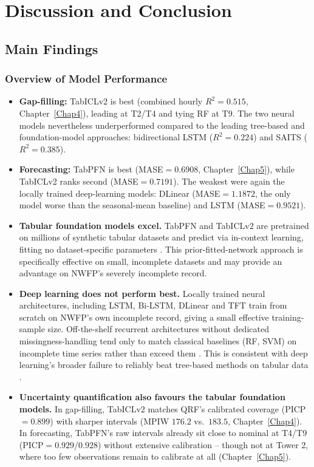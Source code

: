 \chapter{Discussion and Conclusion} \label{Chap7}

\section{Main Findings}

\subsection{Overview of Model Performance} \label{sec:model_performance_overview}

\begin{itemize}
    \item \textbf{Gap-filling:} TabICLv2 is best (combined hourly $R^2=0.515$,
    Chapter~\ref{Chap4}), leading at T2/T4 and tying RF at T9. The two neural models nevertheless 
    underperformed compared to the leading tree-based and foundation-model approaches:
    bidirectional LSTM ($R^2=0.224$) and SAITS ($R^2=0.385$).
    \item \textbf{Forecasting:} TabPFN is best (MASE$=0.6908$, Chapter~\ref{Chap5}), while TabICLv2
    ranks second (MASE$=0.7191$). The weakest were again the locally trained deep-learning models:
    DLinear (MASE$=1.1872$, the only model worse than the seasonal-mean baseline) and LSTM (MASE$=0.9521$).
    \item \textbf{Tabular foundation models excel.} TabPFN and TabICLv2 are pretrained on
    millions of synthetic tabular datasets and predict via in-context learning, fitting no
    dataset-specific parameters \cite{hollmann2023tabpfn,hollmann2025tabpfn,qu2025tabicl,qu2026tabiclv2}.
    This prior-fitted-network approach is specifically effective on small, incomplete datasets
    \cite{hollmann2025tabpfn} and may provide an advantage on NWFP's severely incomplete record.
    \item \textbf{Deep learning does not perform best.} Locally trained neural architectures, 
    including LSTM, Bi-LSTM, DLinear and TFT train from scratch on NWFP's own incomplete 
    record, giving a small effective training-sample size. Off-the-shelf recurrent architectures 
    without dedicated missingness-handling tend only to match classical baselines (RF, SVM) on incomplete
    time series rather than exceed them \cite{che2018grud}. This is consistent with deep learning's broader
    failure to reliably beat tree-based methods on tabular data \cite{grinsztajn2022}.
    \item \textbf{Uncertainty quantification also favours the tabular foundation models.} In
    gap-filling, TabICLv2 matches QRF's calibrated coverage (PICP$=0.899$) with sharper intervals
    (MPIW $176.2$ vs.\ $183.5$, Chapter~\ref{Chap4}). In forecasting, TabPFN's raw intervals
    already sit close to nominal at T4/T9 (PICP$=0.929$/$0.928$) without extensive calibration --
    though not at Tower 2, where too few observations remain to calibrate at all
    (Chapter~\ref{Chap5}).
\end{itemize}

